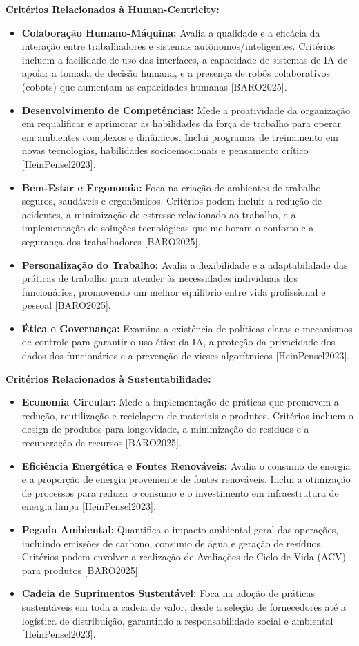 \textbf{Critérios Relacionados à Human-Centricity:}
\begin{itemize}
    \item \textbf{Colaboração Humano-Máquina:} Avalia a qualidade e a eficácia da interação entre trabalhadores e sistemas autônomos/inteligentes. Critérios incluem a facilidade de uso das interfaces, a capacidade de sistemas de IA de apoiar a tomada de decisão humana, e a presença de robôs colaborativos (cobots) que aumentam as capacidades humanas [BARO2025].
    \item \textbf{Desenvolvimento de Competências:} Mede a proatividade da organização em requalificar e aprimorar as habilidades da força de trabalho para operar em ambientes complexos e dinâmicos. Inclui programas de treinamento em novas tecnologias, habilidades socioemocionais e pensamento crítico [HeinPensel2023].
    \item \textbf{Bem-Estar e Ergonomia:} Foca na criação de ambientes de trabalho seguros, saudáveis e ergonômicos. Critérios podem incluir a redução de acidentes, a minimização de estresse relacionado ao trabalho, e a implementação de soluções tecnológicas que melhoram o conforto e a segurança dos trabalhadores [BARO2025].
    \item \textbf{Personalização do Trabalho:} Avalia a flexibilidade e a adaptabilidade das práticas de trabalho para atender às necessidades individuais dos funcionários, promovendo um melhor equilíbrio entre vida profissional e pessoal [BARO2025].
    \item \textbf{Ética e Governança:} Examina a existência de políticas claras e mecanismos de controle para garantir o uso ético da IA, a proteção da privacidade dos dados dos funcionários e a prevenção de vieses algorítmicos [HeinPensel2023].
\end{itemize}

\textbf{Critérios Relacionados à Sustentabilidade:}
\begin{itemize}
    \item \textbf{Economia Circular:} Mede a implementação de práticas que promovem a redução, reutilização e reciclagem de materiais e produtos. Critérios incluem o design de produtos para longevidade, a minimização de resíduos e a recuperação de recursos [BARO2025].
    \item \textbf{Eficiência Energética e Fontes Renováveis:} Avalia o consumo de energia e a proporção de energia proveniente de fontes renováveis. Inclui a otimização de processos para reduzir o consumo e o investimento em infraestrutura de energia limpa [HeinPensel2023].
    \item \textbf{Pegada Ambiental:} Quantifica o impacto ambiental geral das operações, incluindo emissões de carbono, consumo de água e geração de resíduos. Critérios podem envolver a realização de Avaliações de Ciclo de Vida (ACV) para produtos [BARO2025].
    \item \textbf{Cadeia de Suprimentos Sustentável:} Foca na adoção de práticas sustentáveis em toda a cadeia de valor, desde a seleção de fornecedores até a logística de distribuição, garantindo a responsabilidade social e ambiental [HeinPensel2023].
\end{itemize}

